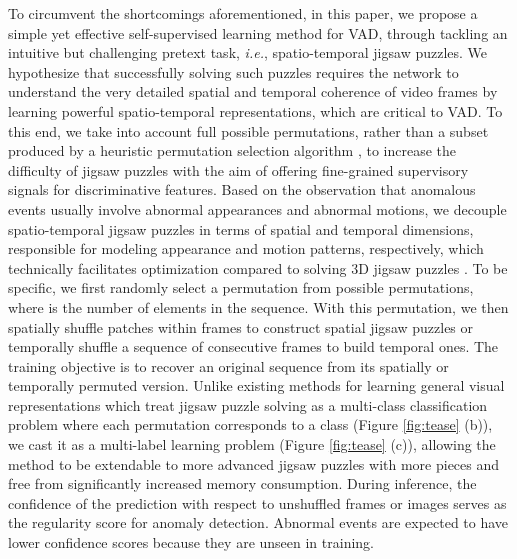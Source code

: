 \documentclass[runningheads]{llncs}
\begin{document}
To circumvent the shortcomings aforementioned, in this paper, we propose a simple yet effective self-supervised learning method for VAD, through tackling an intuitive but challenging pretext task, \emph{i.e.}, spatio-temporal jigsaw puzzles. We hypothesize that successfully solving such puzzles requires the network to understand the very detailed spatial and temporal coherence of video frames by learning powerful spatio-temporal representations, which are critical to VAD. To this end, we take into account full possible permutations, rather than a subset produced by a heuristic permutation selection algorithm \cite{noroozi2016unsupervised}, to increase the difficulty of jigsaw puzzles with the aim of offering fine-grained supervisory signals for discriminative features. Based on the observation that anomalous events usually involve abnormal appearances and abnormal motions, we decouple spatio-temporal jigsaw puzzles in terms of spatial and temporal dimensions, responsible for modeling appearance and motion patterns, respectively, which technically facilitates optimization compared to solving 3D jigsaw puzzles \cite{ahsan2019video}. To be specific, we first randomly select a permutation from  possible permutations, where  is the number of elements in the sequence. With this permutation, we then spatially shuffle patches within frames to construct spatial jigsaw puzzles or temporally shuffle a sequence of consecutive frames to build temporal ones. The training objective is to recover an original sequence from its spatially or temporally permuted version. Unlike existing methods for learning general visual representations \cite{noroozi2016unsupervised, lee2017unsupervised, kim2019self} which treat jigsaw puzzle solving as a multi-class classification problem where each permutation corresponds to a class (Figure \ref{fig:tease} (b)), we cast it as a multi-label learning problem (Figure \ref{fig:tease} (c)), allowing the method to be extendable to more advanced jigsaw puzzles with more pieces and free from significantly increased memory consumption. During inference, the confidence of the prediction with respect to unshuffled frames or images serves as the regularity score for anomaly detection. Abnormal events are expected to have lower confidence scores because they are unseen in training.
\end{document}
